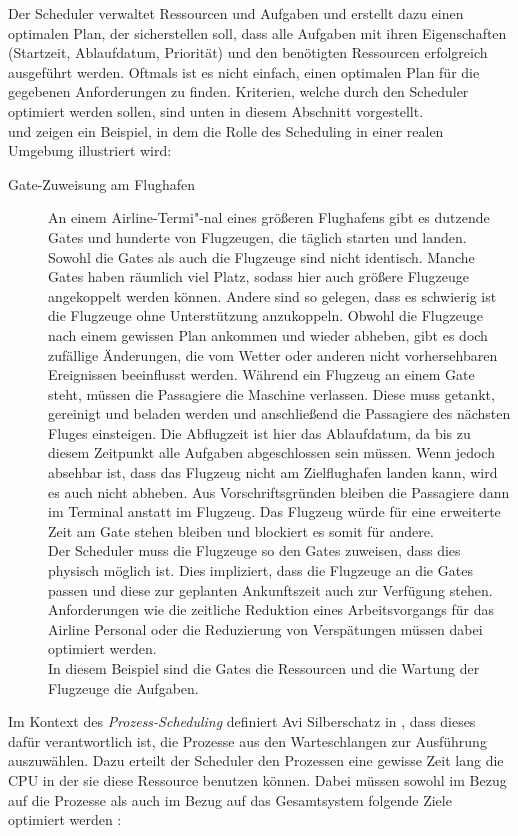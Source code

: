 Der Scheduler verwaltet Ressourcen und Aufgaben und erstellt dazu einen optimalen Plan, der sicherstellen soll, dass alle Aufgaben mit ihren Eigenschaften (Startzeit, Ablaufdatum, Priorität) und den benötigten Ressourcen erfolgreich ausgeführt werden. Oftmals ist es nicht einfach, einen optimalen Plan für die gegebenen Anforderungen zu finden. Kriterien, welche durch den Scheduler optimiert werden sollen, sind unten in diesem Abschnitt vorgestellt.\\
\cite{mpinedo} und \cite{aagnetis} zeigen ein Beispiel, in dem die Rolle des Scheduling in einer realen Umgebung illustriert wird:
\begin{description}
\item[Gate-Zuweisung am Flughafen]
An einem Airline-Termi"-nal eines größeren Flughafens gibt es dutzende Gates und hunderte von Flugzeugen, die täglich starten und landen. Sowohl die Gates als auch die Flugzeuge sind nicht identisch. Manche Gates haben räumlich viel Platz, sodass hier auch größere Flugzeuge angekoppelt werden können. Andere sind so gelegen, dass es schwierig ist die Flugzeuge ohne Unterstützung anzukoppeln. Obwohl die Flugzeuge nach einem gewissen Plan ankommen und wieder abheben, gibt es doch zufällige Änderungen, die vom Wetter oder anderen nicht vorhersehbaren Ereignissen beeinflusst werden. Während ein Flugzeug an einem Gate steht, müssen die Passagiere die Maschine verlassen. Diese muss getankt, gereinigt und beladen werden und anschließend die Passagiere des nächsten Fluges einsteigen. Die Abflugzeit ist hier das Ablaufdatum, da bis zu diesem Zeitpunkt alle Aufgaben abgeschlossen sein müssen. Wenn jedoch absehbar ist, dass das Flugzeug nicht am Zielflughafen landen kann, wird es auch nicht abheben. Aus Vorschriftsgründen bleiben die Passagiere dann im Terminal anstatt im Flugzeug. Das Flugzeug würde für eine erweiterte Zeit am Gate stehen bleiben und blockiert es somit für andere.\\
Der Scheduler muss die Flugzeuge so den Gates zuweisen, dass dies physisch möglich ist. Dies impliziert, dass die Flugzeuge an die Gates passen und diese zur geplanten Ankunftszeit auch zur Verfügung stehen. Anforderungen wie die zeitliche Reduktion eines Arbeitsvorgangs für das Airline Personal oder die Reduzierung von Verspätungen müssen dabei optimiert werden.\\
In diesem Beispiel sind die Gates die Ressourcen und die Wartung der Flugzeuge die Aufgaben. 
\end{description}
Im Kontext des \textit{Prozess-Scheduling} definiert Avi Silberschatz in \cite{asilberschatz}, dass dieses dafür verantwortlich ist, die Prozesse aus den Warteschlangen zur Ausführung aus\-zu\-wäh\-len. Dazu erteilt der Scheduler den Prozessen eine gewisse Zeit lang die CPU in der sie diese Ressource benutzen können. Dabei müssen sowohl im Bezug auf die Prozesse als auch im Bezug auf das Gesamtsystem folgende Ziele optimiert werden \cite{asilberschatz} \cite{rlove}:\\
